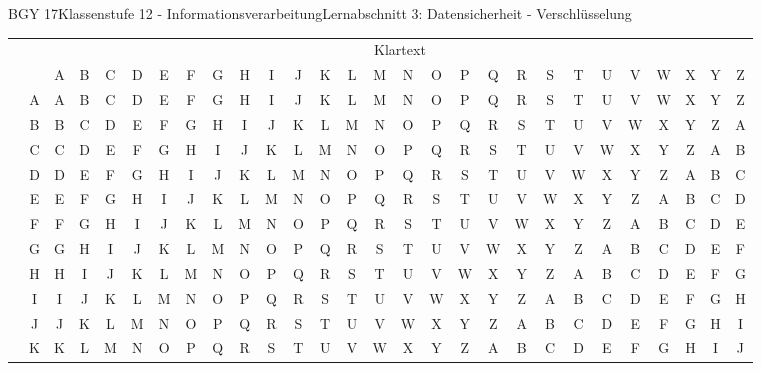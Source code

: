 \documentclass[oneside,openany,headings=optiontotoc,11pt,numbers=noenddot]{scrreprt}
\begin{document}
	\begin{worksheet}{BGY 17}{Klassenstufe 12 - Informationsverarbeitung}{Lernabschnitt 3: Datensicherheit - Verschlüsselung}
		\noindent
		\sffamily
		\begin{landscape}
			\begin{tabularx}{1.12\textheight}{c|c||c|c|c|c|c|c|c|c|c|c|c|c|c|c|c|c|c|c|c|c|c|c|c|c|c|c|}
				\cline{2-28}
				& & \multicolumn{26}{|c|}{Klartext}\\
				\cline{2-28}
				& & A & B & C & D & E & F & G & H & I & J & K & L & M & N & O & P & Q & R & S & T & U & V & W & X & Y & Z\\
				\hline
				\hline
				\rowcolor{gray!15}  &  A & A & B & C & D & E & F & G & H & I & J & K & L & M & N & O & P & Q & R & S & T & U & V & W & X & Y & Z\\
				\cline{2-28}
				& B & B & C & D & E & F & G & H & I & J & K & L & M & N & O & P & Q & R & S & T & U & V & W & X & Y & Z & A\\
				\cline{2-28}
				\rowcolor{gray!15}  &  C & C & D & E & F & G & H & I & J & K & L & M & N & O & P & Q & R & S & T & U & V & W & X & Y & Z & A & B\\
				\cline{2-28}
				& D & D & E & F & G & H & I & J & K & L & M & N & O & P & Q & R & S & T & U & V & W & X & Y & Z & A & B & C\\
				\cline{2-28}
				\rowcolor{gray!15}  & E & E & F & G & H & I & J & K & L & M & N & O & P & Q & R & S & T & U & V & W & X & Y & Z & A & B & C & D\\
				\cline{2-28}
				& F & F & G & H & I & J & K & L & M & N & O & P & Q & R & S & T & U & V & W & X & Y & Z & A & B & C & D & E\\
				\cline{2-28}
				\rowcolor{gray!15}  & G & G & H & I & J & K & L & M & N & O & P & Q & R & S & T & U & V & W & X & Y & Z & A & B & C & D & E & F\\
				\cline{2-28}
				& H & H & I & J & K & L & M & N & O & P & Q & R & S & T & U & V & W & X & Y & Z & A & B & C & D & E & F & G\\
				\cline{2-28}
				\rowcolor{gray!15}  & I & I & J & K & L & M & N & O & P & Q & R & S & T & U & V & W & X & Y & Z & A & B & C & D & E & F & G & H\\
				\cline{2-28}
				& J & J & K & L & M & N & O & P & Q & R & S & T & U & V & W & X & Y & Z & A & B & C & D & E & F & G & H & I\\
				\cline{2-28}
				\rowcolor{gray!15}  & K & K & L & M & N & O & P & Q & R & S & T & U & V & W & X & Y & Z & A & B & C & D & E & F & G & H & I & J\\

\end{tabularx}
\end{landscape}
\end{worksheet}
\end{document}
